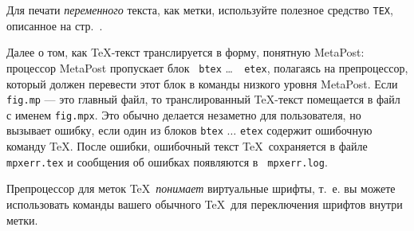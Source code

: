 \documentclass{article} %
\begin{document}
Для печати \emph{переменного} текста, как метки, используйте 
полезное средство \texttt{TEX}, описанное на стр.\ \pageref{dTEX}.

Далее о том, как \TeX-текст транслируется в форму, понятную MetaPost: 
процессор MetaPost пропускает блок {\tt
btex} \ldots\ {\tt
etex}, полагаясь на препроцессор, 
который должен перевести этот блок в команды низкого уровня MetaPost. 
Если {\tt fig.mp} --- это главный файл, то транслированный \TeX-текст 
помещается в файл с именем {\tt fig.mpx}.
Это обычно делается незаметно для пользователя, но вызывает ошибку, если 
один из блоков {\tt btex} $\ldots$ {\tt etex} содержит ошибочную команду 
\TeX{}.
После ошибки, ошибочный текст \TeX\ сохраняется в файле 
{\tt mpxerr.tex} и сообщения об ошибках 
появляются в {\tt
mpxerr.log}.

Препроцессор для меток \TeX\ {\it понимает\/} виртуальные шрифты, т.~е. вы 
можете использовать команды вашего обычного \TeX\ для переключения шрифтов 
внутри метки.
\end{document}
